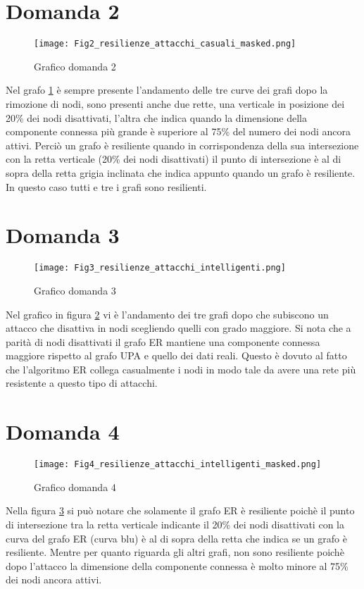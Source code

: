 \documentclass{article}
\begin{document}
\section*{Domanda 2}
\begin{figure}[h]
\texttt{[image: Fig2\_resilienze\_attacchi\_casuali\_masked.png]}
\caption{Grafico domanda 2}
\label{fig:graph2}
\end{figure}
Nel grafo \ref{fig:graph2} è sempre presente l'andamento delle tre curve dei grafi dopo la rimozione di nodi, sono presenti anche due rette, una verticale in posizione dei 20\% dei nodi disattivati, l'altra che indica quando la dimensione della componente connessa più grande è superiore al 75\% del numero dei nodi ancora attivi.
Perciò un grafo è resiliente quando in corrispondenza della sua intersezione con la retta verticale (20\% dei nodi disattivati) il punto di intersezione è al di sopra della retta grigia inclinata che indica appunto quando un grafo è resiliente.
In questo caso tutti e tre i grafi sono resilienti.
\FloatBarrier
\section*{Domanda 3}
\begin{center}
\begin{figure}[h]
\texttt{[image: Fig3\_resilienze\_attacchi\_intelligenti.png]}
\caption{Grafico domanda 3}
\label{fig:graph3}
\end{figure}
\end{center}
Nel grafico in figura \ref{fig:graph3} vi è l'andamento dei tre grafi dopo che subiscono un attacco che disattiva in nodi scegliendo quelli con grado maggiore.
Si nota che a parità di nodi disattivati il grafo ER mantiene una componente connessa maggiore rispetto al grafo UPA e quello dei dati reali.
Questo è dovuto al fatto che l'algoritmo ER collega casualmente i nodi in modo tale da avere una rete più resistente a questo tipo di attacchi.

\FloatBarrier

\section*{Domanda 4}
\begin{center}
\begin{figure}[h]
\texttt{[image: Fig4\_resilienze\_attacchi\_intelligenti\_masked.png]}
\caption{Grafico domanda 4}
\label{fig:graph4}
\end{figure}
\end{center}

Nella figura \ref{fig:graph4} si può notare che solamente il grafo ER è resiliente poichè il punto di intersezione tra la retta verticale indicante il 20\% dei nodi disattivati con la curva del grafo ER (curva blu) è al di sopra della retta che indica se un grafo è resiliente.
Mentre per quanto riguarda gli altri grafi, non sono resiliente poichè dopo l'attacco la dimensione della componente connessa è molto minore al 75\% dei nodi ancora attivi.

\FloatBarrier
\end{document}
